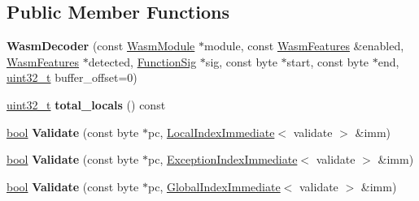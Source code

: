 \subsection*{Public Member Functions}
\begin{DoxyCompactItemize}
\item 
\mbox{\label{classv8_1_1internal_1_1wasm_1_1WasmDecoder_a544641eacc00d70993b5986331d9f845}} 
{\bfseries Wasm\+Decoder} (const \mbox{\hyperlink{structv8_1_1internal_1_1wasm_1_1WasmModule}{Wasm\+Module}} $\ast$module, const \mbox{\hyperlink{structv8_1_1internal_1_1wasm_1_1WasmFeatures}{Wasm\+Features}} \&enabled, \mbox{\hyperlink{structv8_1_1internal_1_1wasm_1_1WasmFeatures}{Wasm\+Features}} $\ast$detected, \mbox{\hyperlink{classv8_1_1internal_1_1Signature}{Function\+Sig}} $\ast$sig, const byte $\ast$start, const byte $\ast$end, \mbox{\hyperlink{classuint32__t}{uint32\+\_\+t}} buffer\+\_\+offset=0)
\item 
\mbox{\label{classv8_1_1internal_1_1wasm_1_1WasmDecoder_a48121e1eeecdf591da35569467b4c372}} 
\mbox{\hyperlink{classuint32__t}{uint32\+\_\+t}} {\bfseries total\+\_\+locals} () const
\item 
\mbox{\label{classv8_1_1internal_1_1wasm_1_1WasmDecoder_ae652ff1afbcc0608d1c69ae7423783c4}} 
\mbox{\hyperlink{classbool}{bool}} {\bfseries Validate} (const byte $\ast$pc, \mbox{\hyperlink{structv8_1_1internal_1_1wasm_1_1LocalIndexImmediate}{Local\+Index\+Immediate}}$<$ validate $>$ \&imm)
\item 
\mbox{\label{classv8_1_1internal_1_1wasm_1_1WasmDecoder_a878fb642e5fa970e3cb564f583182d47}} 
\mbox{\hyperlink{classbool}{bool}} {\bfseries Validate} (const byte $\ast$pc, \mbox{\hyperlink{structv8_1_1internal_1_1wasm_1_1ExceptionIndexImmediate}{Exception\+Index\+Immediate}}$<$ validate $>$ \&imm)
\item 
\mbox{\label{classv8_1_1internal_1_1wasm_1_1WasmDecoder_afe6fa7a6bda3f8f28b0e84f17c24042b}} 
\mbox{\hyperlink{classbool}{bool}} {\bfseries Validate} (const byte $\ast$pc, \mbox{\hyperlink{structv8_1_1internal_1_1wasm_1_1GlobalIndexImmediate}{Global\+Index\+Immediate}}$<$ validate $>$ \&imm)

\end{DoxyCompactItemize}
